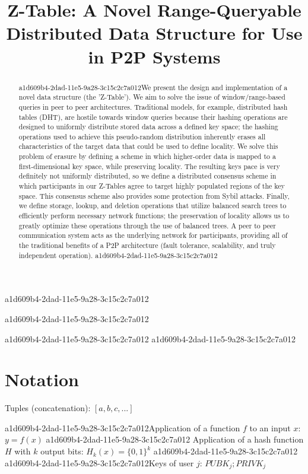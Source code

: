 \documentclass[12pt]{article}
\title{Z-Table: A Novel Range-Queryable Distributed Data Structure for Use in P2P Systems}
\begin{document}
a1d609b4-2dad-11e5-9a28-3c15c2c7a012
\maketitle
a1d609b4-2dad-11e5-9a28-3c15c2c7a012
\begin{abstract}
a1d609b4-2dad-11e5-9a28-3c15c2c7a012We present the design and implementation of a novel data structure (the 'Z-Table'). We aim to solve the issue of window/range-based queries in peer to peer architectures. Traditional models, for example,  distributed hash tables (DHT), are hostile towards window queries because their hashing operations are designed to uniformly distribute stored data across a defined key space; the hashing operations used to achieve this pseudo-random distribution inherently erases all characteristics of the target data that could be used to define locality. We solve this problem of erasure by defining a scheme in which higher-order data is mapped to a first-dimensional key space, while preserving locality. The resulting keys pace is very definitely not uniformly distributed, so we define a distributed consensus scheme in which participants in our Z-Tables agree to target highly populated regions of the key space. This consensus scheme also provides some protection from Sybil attacks. Finally, we define storage, lookup, and deletion operations that utilize balanced search trees to efficiently perform necessary network functions; the preservation of locality allows us to greatly optimize these operations through the use of balanced trees. A peer to peer communication system acts as the underlying network for participants, providing all of the traditional benefits of a P2P architecture (fault tolerance, scalability, and truly independent operation).
a1d609b4-2dad-11e5-9a28-3c15c2c7a012\end{abstract}
a1d609b4-2dad-11e5-9a28-3c15c2c7a012
a1d609b4-2dad-11e5-9a28-3c15c2c7a012\section{Notation}

Tuples (concatenation): $[a,b,c,...]$

a1d609b4-2dad-11e5-9a28-3c15c2c7a012Application of a function $f$ to an input $x$: $y=f(x)$
a1d609b4-2dad-11e5-9a28-3c15c2c7a012
Application of a hash function $H$ with $k$ output bits: $H_{k}(x) = \{0,1\}^k$
a1d609b4-2dad-11e5-9a28-3c15c2c7a012
a1d609b4-2dad-11e5-9a28-3c15c2c7a012Keys of user $j$: $ PUBK_j; PRIVK_j $
\end{document}
